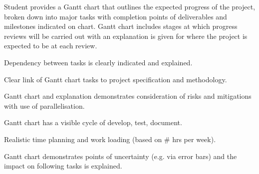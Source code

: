 Student provides a Gantt chart that outlines the expected progress of the project, broken down into major tasks with completion points of deliverables and milestones indicated on chart. Gantt chart includes stages at which progress reviews will be carried out with an explanation is given for where the project is expected to be at each review.

Dependency between tasks is clearly indicated and explained.

Clear link of Gantt chart tasks to project specification and methodology.

Gantt chart and explanation demonstrates consideration of risks and mitigations with use of parallelisation.

Gantt chart has a visible cycle of develop, test, document.

Realistic time planning and work loading (based on # hrs per week).

Gantt chart demonstrates points of uncertainty (e.g. via error bars) and the impact on following tasks is explained.